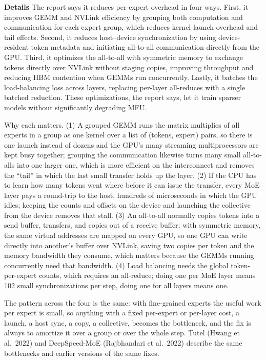 \documentclass[11pt,letterpaper]{article}
\newcommand{\para}[1]{\medskip\noindent\textbf{#1}\quad}
\begin{document}
\para{Details} The report says it reduces per-expert overhead in four ways. First, it improves GEMM and NVLink efficiency by grouping both computation and communication for each expert group, which reduces kernel-launch overhead and tail effects. Second, it reduces host--device synchronization by using device-resident token metadata and initiating all-to-all communication directly from the GPU. Third, it optimizes the all-to-all with symmetric memory to exchange tokens directly over NVLink without staging copies, improving throughput and reducing HBM contention when GEMMs run concurrently. Lastly, it batches the load-balancing loss across layers, replacing per-layer all-reduces with a single batched reduction. These optimizations, the report says, let it train sparser models without significantly degrading MFU.

Why each matters. (1) A grouped GEMM runs the matrix multiplies of all experts in a group as one kernel over a list of (tokens, expert) pairs, so there is one launch instead of dozens and the GPU's many streaming multiprocessors are kept busy together; grouping the communication likewise turns many small all-to-alls into one larger one, which is more efficient on the interconnect and removes the ``tail'' in which the last small transfer holds up the layer. (2) If the CPU has to learn how many tokens went where before it can issue the transfer, every MoE layer pays a round-trip to the host, hundreds of microseconds in which the GPU idles; keeping the counts and offsets on the device and launching the collective from the device removes that stall. (3) An all-to-all normally copies tokens into a send buffer, transfers, and copies out of a receive buffer; with symmetric memory, the same virtual addresses are mapped on every GPU, so one GPU can write directly into another's buffer over NVLink, saving two copies per token and the memory bandwidth they consume, which matters because the GEMMs running concurrently need that bandwidth. (4) Load balancing needs the global token-per-expert counts, which requires an all-reduce; doing one per MoE layer means 102 small synchronizations per step, doing one for all layers means one.

The pattern across the four is the same: with fine-grained experts the useful work per expert is small, so anything with a fixed per-expert or per-layer cost, a launch, a host sync, a copy, a collective, becomes the bottleneck, and the fix is always to amortize it over a group or over the whole step. Tutel (Hwang et al.\ 2022) and DeepSpeed-MoE (Rajbhandari et al.\ 2022) describe the same bottlenecks and earlier versions of the same fixes.
\end{document}
